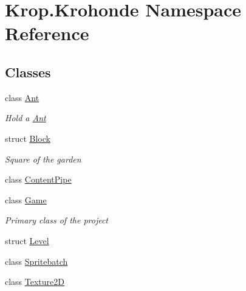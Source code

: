 \hypertarget{namespace_krop_1_1_krohonde}{}\section{Krop.\+Krohonde Namespace Reference}
\label{namespace_krop_1_1_krohonde}
\subsection*{Classes}
\begin{DoxyCompactItemize}
\item 
class \mbox{\hyperlink{class_krop_1_1_krohonde_1_1_ant}{Ant}}
\begin{DoxyCompactList}\small\item\em Hold a \mbox{\hyperlink{class_krop_1_1_krohonde_1_1_ant}{Ant}} \end{DoxyCompactList}\item 
struct \mbox{\hyperlink{struct_krop_1_1_krohonde_1_1_block}{Block}}
\begin{DoxyCompactList}\small\item\em Square of the garden \end{DoxyCompactList}\item 
class \mbox{\hyperlink{class_krop_1_1_krohonde_1_1_content_pipe}{Content\+Pipe}}
\item 
class \mbox{\hyperlink{class_krop_1_1_krohonde_1_1_game}{Game}}
\begin{DoxyCompactList}\small\item\em Primary class of the project \end{DoxyCompactList}\item 
struct \mbox{\hyperlink{struct_krop_1_1_krohonde_1_1_level}{Level}}
\item 
class \mbox{\hyperlink{class_krop_1_1_krohonde_1_1_spritebatch}{Spritebatch}}
\item 
class \mbox{\hyperlink{class_krop_1_1_krohonde_1_1_texture2_d}{Texture2D}}
\end{DoxyCompactItemize}
